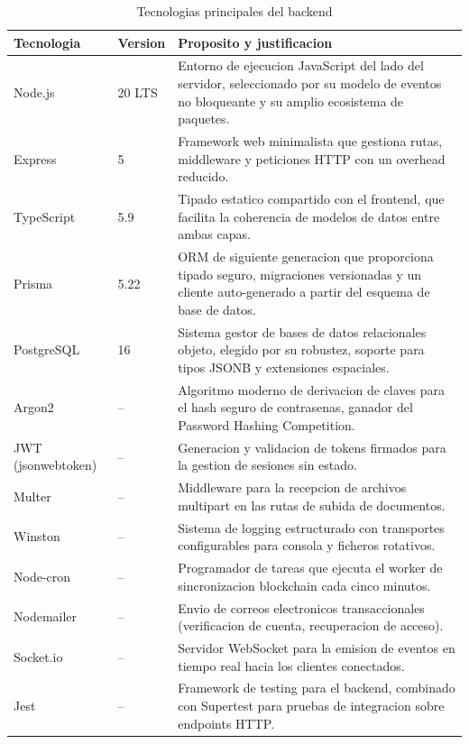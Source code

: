 \documentclass[11pt, a4paper]{article}
\begin{document}
\begin{table}[H]
\centering
\renewcommand{\arraystretch}{1.4}
\small
\begin{tabular}{@{}llp{7.5cm}@{}}
\toprule
\textbf{Tecnologia} & \textbf{Version} & \textbf{Proposito y justificacion} \\
\midrule
Node.js & 20 LTS & Entorno de ejecucion JavaScript del lado del servidor, seleccionado por su modelo de eventos no bloqueante y su amplio ecosistema de paquetes. \\
Express & 5 & Framework web minimalista que gestiona rutas, middleware y peticiones HTTP con un overhead reducido. \\
TypeScript & 5.9 & Tipado estatico compartido con el frontend, que facilita la coherencia de modelos de datos entre ambas capas. \\
Prisma & 5.22 & ORM de siguiente generacion que proporciona tipado seguro, migraciones versionadas y un cliente auto-generado a partir del esquema de base de datos. \\
PostgreSQL & 16 & Sistema gestor de bases de datos relacionales objeto, elegido por su robustez, soporte para tipos JSONB y extensiones espaciales. \\
Argon2 & -- & Algoritmo moderno de derivacion de claves para el hash seguro de contrasenas, ganador del Password Hashing Competition. \\
JWT (jsonwebtoken) & -- & Generacion y validacion de tokens firmados para la gestion de sesiones sin estado. \\
Multer & -- & Middleware para la recepcion de archivos multipart en las rutas de subida de documentos. \\
Winston & -- & Sistema de logging estructurado con transportes configurables para consola y ficheros rotativos. \\
Node-cron & -- & Programador de tareas que ejecuta el worker de sincronizacion blockchain cada cinco minutos. \\
Nodemailer & -- & Envio de correos electronicos transaccionales (verificacion de cuenta, recuperacion de acceso). \\
Socket.io & -- & Servidor WebSocket para la emision de eventos en tiempo real hacia los clientes conectados. \\
Jest & -- & Framework de testing para el backend, combinado con Supertest para pruebas de integracion sobre endpoints HTTP. \\
\bottomrule
\end{tabular}
\caption{Tecnologias principales del backend}
\label{tab:tech-backend}
\end{table}
\end{document}
